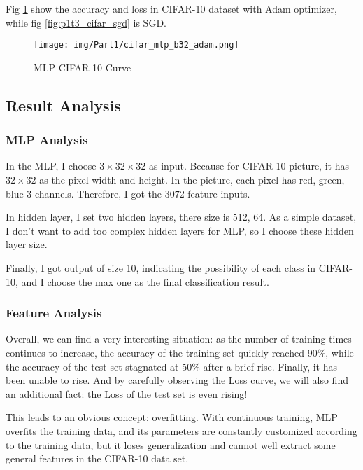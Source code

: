 Fig \ref{fig:p1t3_cifar_adam} show the accuracy and loss in CIFAR-10 dataset with Adam optimizer, while fig \ref{fig:p1t3_cifar_sgd} is SGD.

\begin{figure}[!htbp]
  \centering
  \texttt{[image: img/Part1/cifar\_mlp\_b32\_adam.png]}
  \caption{MLP CIFAR-10 Curve}
  \label{fig:p1t3_cifar_adam}
\end{figure}

\subsection{Result Analysis}

\subsubsection{MLP Analysis}

In the MLP, I choose $3 \times 32 \times 32$ as input. Because for CIFAR-10 picture, it has $32 \times 32$ as the pixel width and height.
In the picture, each pixel has red, green, blue 3 channels. Therefore, I got the $3072$ feature inputs.

In hidden layer, I set two hidden layers, there size is 512, 64.
As a simple dataset, I don't want to add too complex hidden layers for MLP, so I choose these hidden layer size.

Finally, I got output of size 10, indicating the possibility of each class in CIFAR-10, and I choose the max one as the final classification result.

\subsubsection{Feature Analysis}

Overall, we can find a very interesting situation: as the number of training times continues to increase, the accuracy of the training set quickly reached 90\%, while the accuracy of the test set stagnated at 50\% after a brief rise.
Finally, it has been unable to rise. And by carefully observing the Loss curve, we will also find an additional fact: the Loss of the test set is even rising!

This leads to an obvious concept: overfitting. With continuous training, MLP overfits the training data, and its parameters are constantly customized according to the training data,
but it loses generalization and cannot well extract some general features in the CIFAR-10 data set.

